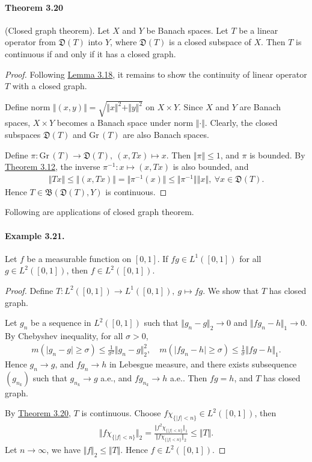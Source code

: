 \documentclass{article}
\newcommand{\Gr}{\mathrm{Gr}\,}
\begin{document}
\paragraph{Theorem 3.20\label{thm:3.20}} (Closed graph theorem). Let $X$ and $Y$ be Banach spaces. Let $T$ be a linear operator from $\mathfrak{D}(T)$ into $Y$, where $\mathfrak{D}(T)$ is a closed subspace of $X$. Then $T$ is continuous if and only if it has a closed graph.
\begin{proof}
Following \hyperref[lemma:3.18]{Lemma 3.18}, it remains to show the continuity of linear operator $T$ with a closed graph. 

Define norm $\Vert(x,y)\Vert=\sqrt{\Vert x\Vert^2 + \Vert y\Vert^2}$ on $X\times Y$. Since $X$ and $Y$ are Banach spaces, $X\times Y$ becomes a Banach space under norm $\Vert\cdot\Vert$. Clearly, the closed subspaces $\mathfrak{D}(T)$ and $\Gr(T)$ are also Banach spaces.

Define $\pi:\Gr(T)\to\mathfrak{D}(T),\ (x,Tx)\mapsto x$. Then $\Vert\pi\Vert\leq 1$, and $\pi$ is bounded. By \hyperref[thm:3.12]{Theorem 3.12}, the inverse $\pi^{-1}:x\mapsto (x,Tx)$ is also bounded, and
\begin{align*}
	\Vert Tx\Vert\leq \Vert(x,Tx)\Vert = \Vert\pi^{-1}(x)\Vert \leq \Vert\pi^{-1}\Vert\left\Vert x\right\Vert,\ \forall x\in\mathfrak{D}(T).
\end{align*}
Hence $T\in\mathfrak{B}(\mathfrak{D}(T),Y)$ is continuous.
\end{proof}

Following are applications of closed graph theorem.
\paragraph{Example 3.21.\label{example:3.21}} Let $f$ be a measurable function on $[0,1]$. If $fg\in L^1([0,1])$ for all $g\in L^2([0,1])$, then $f\in L^2([0,1])$.
\begin{proof}
Define $T:L^2([0,1])\to L^1([0,1]),\ g\mapsto fg$. We show that $T$ has closed graph. 

Let $g_n$ be a sequence in $L^2([0,1])$ such that $\Vert g_n - g\Vert_2\to 0$ and $\Vert fg_n - h\Vert_1\to 0$. By Chebyshev inequality, for all $\sigma>0$, 
\begin{align*}
	m(\vert g_n - g\vert \geq \sigma) \leq \frac{1}{\sigma^2}\Vert g_n - g\Vert_2^2,\quad	m(\vert fg_n - h\vert \geq \sigma)\leq \frac{1}{\sigma}\Vert fg-h \Vert_1.
\end{align*}
Hence $g_n\to g$, and $fg_n\to h$ in Lebesgue measure, and there exists subsequence $(g_{n_k})$ such that $g_{n_k}\to g$ a.e., and $fg_{n_k}\to h$ a.e.. Then $fg=h$, and $T$ has closed graph.

By \hyperref[thm:3.20]{Theorem 3.20}, $T$ is continuous. Choose $f\chi_{\{\vert f\vert< n\}}\in L^2([0,1])$, then
\begin{align*}
	\Vert f\chi_{\{\vert f\vert < n\}}\Vert_2 = \frac{\Vert f^2\chi_{\{\vert f\vert < n\}}\Vert_1}{\Vert f\chi_{\{\vert f\vert < n\}}\Vert_2} \leq \Vert T\Vert.
\end{align*}
Let $n\to\infty$, we have $\Vert f\Vert_2\leq\Vert T\Vert$. Hence $f\in L^2([0,1])$.
\end{proof}
\end{document}
